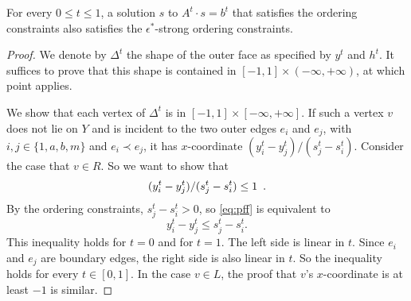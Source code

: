 


\begin{lem}
   For every $0\le t\le 1$, a solution $s$ to $A^t\cdot s = b^t$
   that satisfies the ordering constraints also satisfies the
   $\epsilon^*$-strong ordering constraints. 
\end{lem}

\begin{proof}
We denote by $\Delta^t$ the shape of the outer face as specified by
$y^t$ and $h^t$.  
It suffices to prove that this shape
is contained in
$[-1,1]\times(-\infty,+\infty)$,
at which point  applies.

We show that each vertex of $\Delta^t$ is in $[-1,1]\times[-\infty,+\infty]$.
If such a vertex $v$ does not lie on $Y$ and is incident to
the two outer edges
$e_i$ and $e_j$, with $i,j\in \{1,a,b,m\}$ and $e_i \prec e_j$, it
has $x$-coordinate $( y_i^t - y_j^t ) / ( s_j^t - 
s_i^t )$.
Consider the case that $v\in R$. So we want to show that
\begin{equation}
( y_i^t - y_j^t ) / ( s_j^t - s_i^t )  \le 1 \enspace . \eqlabel{pff}
\end{equation}
By the ordering constraints, $s_j^t - s_i^t > 0$, so \eqref{eq:pff} is
equivalent to
\begin{equation*}
  y_i^t - y_j^t  \le  s_j^t - s_i^t.
\end{equation*}
This inequality holds for $t=0$ and for $t=1$. The left side is linear
in $t$.
Since $e_i$ and $e_j$ are boundary edges, the right side is also
linear in $t$.
So the inequality holds for 
every $t\in [0,1]$.
In the case $v\in L$, the proof that $v$'s $x$-coordinate is at 
least $-1$ is similar.
\end{proof}


